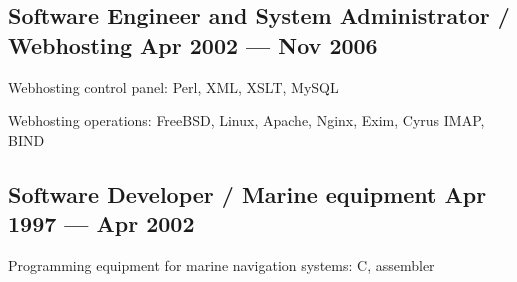 \documentclass[letter,10pt]{article}
\begin{document}
\subsection{{Software Engineer and System Administrator / Webhosting \hfill Apr 2002 --- Nov 2006}}
\begin{zitemize}
\item Webhosting control panel: Perl, XML, XSLT, MySQL
\item Webhosting operations: FreeBSD, Linux, Apache, Nginx, Exim, Cyrus IMAP, BIND
\end{zitemize}

\subsection{{Software Developer / Marine equipment \hfill Apr 1997 --- Apr 2002}}
\begin{zitemize}
\item Programming equipment for marine navigation systems: C, assembler
\end{zitemize}
\end{document}
